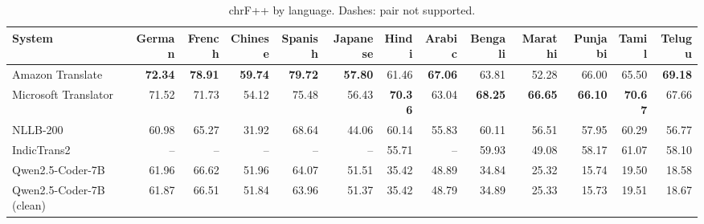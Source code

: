 \begin{table}[t]
\centering
\caption{chrF++ by language. Dashes: pair not supported.\label{tab:chrf_lang}}
\begin{tabular}{lrrrrrrrrrrrr}
\toprule
System & German & French & Chinese & Spanish & Japanese & Hindi & Arabic & Bengali & Marathi & Punjabi & Tamil & Telugu \\
\midrule
Amazon Translate & \textbf{72.34} & \textbf{78.91} & \textbf{59.74} & \textbf{79.72} & \textbf{57.80} & 61.46 & \textbf{67.06} & 63.81 & 52.28 & 66.00 & 65.50 & \textbf{69.18} \\
Microsoft Translator & 71.52 & 71.73 & 54.12 & 75.48 & 56.43 & \textbf{70.36} & 63.04 & \textbf{68.25} & \textbf{66.65} & \textbf{66.10} & \textbf{70.67} & 67.66 \\
NLLB-200 & 60.98 & 65.27 & 31.92 & 68.64 & 44.06 & 60.14 & 55.83 & 60.11 & 56.51 & 57.95 & 60.29 & 56.77 \\
IndicTrans2 & -- & -- & -- & -- & -- & 55.71 & -- & 59.93 & 49.08 & 58.17 & 61.07 & 58.10 \\
Qwen2.5-Coder-7B & 61.96 & 66.62 & 51.96 & 64.07 & 51.51 & 35.42 & 48.89 & 34.84 & 25.32 & 15.74 & 19.50 & 18.58 \\
Qwen2.5-Coder-7B (clean) & 61.87 & 66.51 & 51.84 & 63.96 & 51.37 & 35.42 & 48.79 & 34.89 & 25.33 & 15.73 & 19.51 & 18.67 \\
\bottomrule
\end{tabular}
\end{table}
